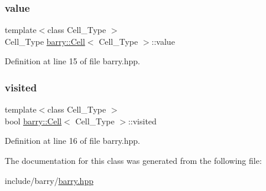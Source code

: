 \subsubsection{\texorpdfstring{value}{value}}
{\footnotesize\ttfamily template$<$class Cell\+\_\+\+Type $>$ \\
Cell\+\_\+\+Type \hyperlink{classbarry_1_1_cell}{barry\+::\+Cell}$<$ Cell\+\_\+\+Type $>$\+::value}



Definition at line 15 of file barry.\+hpp.

\mbox{\label{classbarry_1_1_cell_ad7800879e5079e6b5a3982827adc38c1}} 
\subsubsection{\texorpdfstring{visited}{visited}}
{\footnotesize\ttfamily template$<$class Cell\+\_\+\+Type $>$ \\
bool \hyperlink{classbarry_1_1_cell}{barry\+::\+Cell}$<$ Cell\+\_\+\+Type $>$\+::visited}



Definition at line 16 of file barry.\+hpp.



The documentation for this class was generated from the following file\+:\begin{DoxyCompactItemize}
\item 
include/barry/\hyperlink{barry_8hpp}{barry.\+hpp}\end{DoxyCompactItemize}
